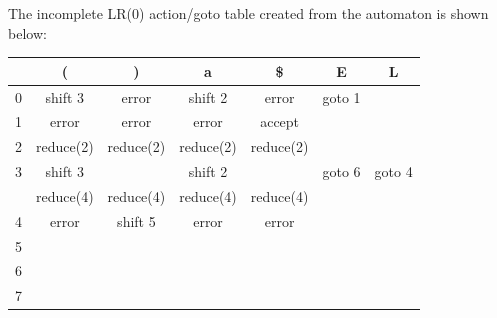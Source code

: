 \documentclass[12pt]{article}
\begin{document}
\begin{exe}
The incomplete LR(0) action/goto table created from the automaton is shown below:
\begin{center}
\begin{tabular}{||l|c|c|c|c||c|c||}
\hline
   & (       & )     & a       & \$    & E      & L \\
\hline
\hline
 0 & shift 3 & error & shift 2 & error & goto 1 &     \\
\hline
 1 & error   & error & error   & accept &       &     \\
 \hline
 2 & reduce(2) & reduce(2) & reduce(2)   & reduce(2) &       &      \\
 \hline
 3 & shift  3 & & shift  2 &  &  goto 6     & goto 4     \\
   & reduce(4) & reduce(4) & reduce(4) & reduce(4) &       &    \\
 \hline
 4 &  error & shift 5 & error  &  error &       &      \\
 \hline
 5 &  &  &    &  &       &      \\
 \hline
 6 &  &  &    &  &       &      \\
 \hline
 7 &  &  &    &  &       &      \\
 \hline
 \hline
\end{tabular}
\end{center}

\bigskip


\end{exe}
\end{document}
